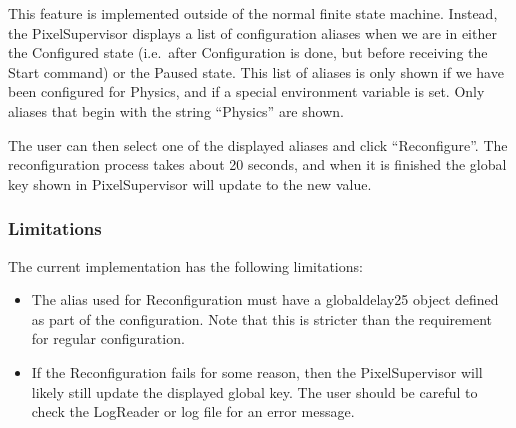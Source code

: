 This feature is implemented outside of the normal finite state
machine. Instead, the PixelSupervisor displays a list of configuration
aliases when we are in either the Configured state (i.e.\ after
Configuration is done, but before receiving the Start command) or the
Paused state. This list of aliases is only shown if we have been
configured for Physics, and if a special environment variable is
set. Only aliases that begin with the string ``Physics'' are shown.

The user can then select one of the displayed aliases and click ``Reconfigure''. The reconfiguration process takes about 20 seconds, and when it is finished the global key shown in PixelSupervisor will update to the new value.

\subsubsection{Limitations}

The current implementation has the following limitations:

\begin{itemize}
\item The alias used for Reconfiguration must have a globaldelay25 object
defined as part of the configuration. Note that this is stricter than
the requirement for regular configuration.

\item If the Reconfiguration fails for some reason, then the PixelSupervisor will likely still update the displayed global key. The user should be careful to check the LogReader or log file for an error message.

\end{itemize}

